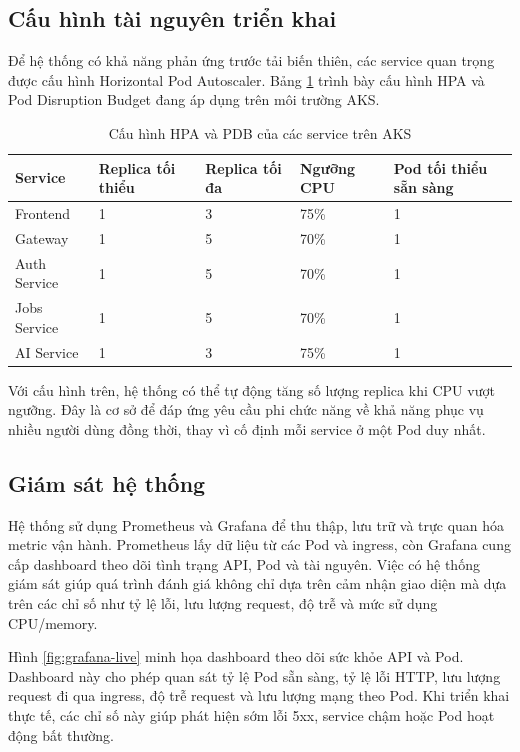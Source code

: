 \documentclass[../DoAn.tex]{subfiles}
\begin{document}
\subsection{Cấu hình tài nguyên triển khai}

Để hệ thống có khả năng phản ứng trước tải biến thiên, các service quan trọng được cấu hình Horizontal Pod Autoscaler. Bảng \ref{tab:k8s-hpa} trình bày cấu hình HPA và Pod Disruption Budget đang áp dụng trên môi trường AKS.

\begin{table}[H]
\centering
\caption{Cấu hình HPA và PDB của các service trên AKS}
\label{tab:k8s-hpa}
\small
\begin{tabular}{|p{3cm}|p{2.1cm}|p{2.1cm}|p{2.4cm}|p{2.5cm}|}
\hline
\textbf{Service} & \textbf{Replica tối thiểu} & \textbf{Replica tối đa} & \textbf{Ngưỡng CPU} & \textbf{Pod tối thiểu sẵn sàng} \\ \hline
Frontend & 1 & 3 & 75\% & 1 \\ \hline
Gateway & 1 & 5 & 70\% & 1 \\ \hline
Auth Service & 1 & 5 & 70\% & 1 \\ \hline
Jobs Service & 1 & 5 & 70\% & 1 \\ \hline
AI Service & 1 & 3 & 75\% & 1 \\ \hline
\end{tabular}
\end{table}

Với cấu hình trên, hệ thống có thể tự động tăng số lượng replica khi CPU vượt ngưỡng. Đây là cơ sở để đáp ứng yêu cầu phi chức năng về khả năng phục vụ nhiều người dùng đồng thời, thay vì cố định mỗi service ở một Pod duy nhất.

\subsection{Giám sát hệ thống}

Hệ thống sử dụng Prometheus và Grafana để thu thập, lưu trữ và trực quan hóa metric vận hành. Prometheus lấy dữ liệu từ các Pod và ingress, còn Grafana cung cấp dashboard theo dõi tình trạng API, Pod và tài nguyên. Việc có hệ thống giám sát giúp quá trình đánh giá không chỉ dựa trên cảm nhận giao diện mà dựa trên các chỉ số như tỷ lệ lỗi, lưu lượng request, độ trễ và mức sử dụng CPU/memory.

Hình \ref{fig:grafana-live} minh họa dashboard theo dõi sức khỏe API và Pod. Dashboard này cho phép quan sát tỷ lệ Pod sẵn sàng, tỷ lệ lỗi HTTP, lưu lượng request đi qua ingress, độ trễ request và lưu lượng mạng theo Pod. Khi triển khai thực tế, các chỉ số này giúp phát hiện sớm lỗi 5xx, service chậm hoặc Pod hoạt động bất thường.
\end{document}
